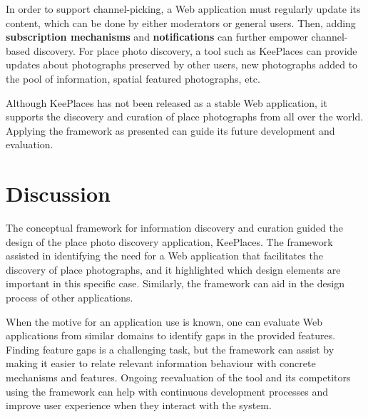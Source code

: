 {In order to support channel-picking, a Web application must regularly update its content, which can be done by either moderators or general users. Then, adding \textbf{subscription mechanisms} and \textbf{notifications} can further empower channel-based discovery.  For place photo discovery, a tool such as KeePlaces can provide updates about photographs preserved by other users, new photographs added to the pool of information, spatial featured photographs, etc.

Although KeePlaces has not been released as a stable Web application, it supports the discovery and curation of place photographs from all over the world. Applying the framework as presented can guide its future development and evaluation.  
} %

{\section{Discussion}
The conceptual framework for information discovery and curation guided the design of the place photo discovery application, KeePlaces. The framework assisted in identifying the need for a Web application that facilitates the discovery of place photographs, and it highlighted which design elements are important in this specific case. Similarly, the framework can aid in the design process of other applications. 

\pagebreak

When the motive for an application use is known, one can evaluate Web applications from similar domains to identify gaps in the provided features. Finding feature gaps is a challenging task, but the framework can assist by making it easier to relate relevant information behaviour with concrete mechanisms and features. Ongoing reevaluation of the tool and its competitors using the framework can help with continuous development processes and improve user experience when they interact with the system.
} %




